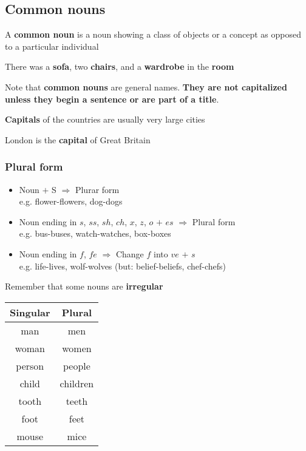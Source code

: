 \documentclass[10pt,a4paper]{article}
\begin{document}
\subsection{Common nouns}
A \textbf{common noun} is a noun showing a class of objects or a concept as opposed to a particular individual\\
\begin{center}
There was a \textbf{sofa}, two \textbf{chairs}, and a \textbf{wardrobe} in the \textbf{room}
\end{center}
\indent
Note that \textbf{common nouns} are general names. \textbf{They are not capitalized unless they begin a sentence or are part of a title}.
\begin{center}
\textbf{Capitals} of the countries are usually very large cities
\end{center}
\begin{center}
London is the \textbf{capital} of Great Britain
\end{center}
\subsubsection{Plural form}
\begin{itemize}
\item Noun $+$ S $\Rightarrow$ Plurar form \\e.g. flower-flowers, dog-dogs
\item Noun ending in $s$, $ss$, $sh$, $ch$, $x$, $z$, $o$ $+$ $es$ $\Rightarrow$ Plural form \\ e.g. bus-buses, watch-watches, box-boxes
\item Noun ending in $f$, $fe$ $\Rightarrow$ Change $f$ into $ve$ $+$ $s$ \\e.g. life-lives, wolf-wolves \quad (but: belief-beliefs, chef-chefs)
\end{itemize}
Remember that some nouns are \textbf{irregular}\\
\begin{center}
\begin{tabular}{|c|c|}
\hline
\textbf{Singular} & \textbf{Plural}\\
\hline
man & men\\
woman & women\\
person & people\\
child & children\\
tooth & teeth\\
foot & feet\\
mouse & mice\\
\hline
\end{tabular}
\end{center}
\end{document}
